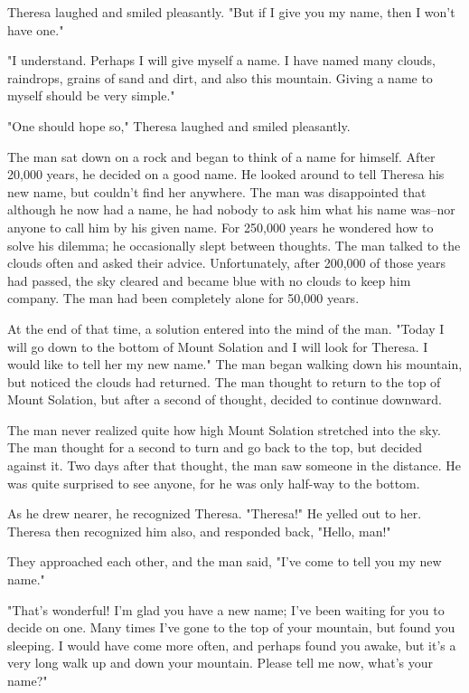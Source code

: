 Theresa laughed and smiled pleasantly. "But if I give you my name, then I won't have one."

"I understand. Perhaps I will give myself a name. I have named many clouds, raindrops, grains of sand and dirt, and also this mountain. Giving a name to myself should be very simple."

"One should hope so," Theresa laughed and smiled pleasantly.

The man sat down on a rock and began to think of a name for himself. After 20,000 years, he decided on a good name. He looked around to tell Theresa his new name, but couldn't find her anywhere. The man was disappointed that although he now had a name, he had nobody to ask him what his name was--nor anyone to call him by his given name. For 250,000 years he wondered how to solve his dilemma; he occasionally slept between thoughts. The man talked to the clouds often and asked their advice. Unfortunately, after 200,000 of those years had passed, the sky cleared and became blue with no clouds to keep him company. The man had been completely alone for 50,000 years.

At the end of that time, a solution entered into the mind of the man. "Today I will go down to the bottom of Mount Solation and I will look for Theresa. I would like to tell her my new name." The man began walking down his mountain, but noticed the clouds had returned. The man thought to return to the top of Mount Solation, but after a second of thought, decided to continue downward.

The man never realized quite how high Mount Solation stretched into the sky. The man thought for a second to turn and go back to the top, but decided against it. Two days after that thought, the man saw someone in the distance. He was quite surprised to see anyone, for he was only half-way to the bottom.

As he drew nearer, he recognized Theresa. "Theresa!" He yelled out to her. Theresa then recognized him also, and responded back, "Hello, man!"

They approached each other, and the man said, "I've come to tell you my new name."

"That's wonderful! I'm glad you have a new name; I've been waiting for you to decide on one. Many times I've gone to the top of your mountain, but found you sleeping. I would have come more often, and perhaps found you awake, but it's a very long walk up and down your mountain. Please tell me now, what's your name?"

